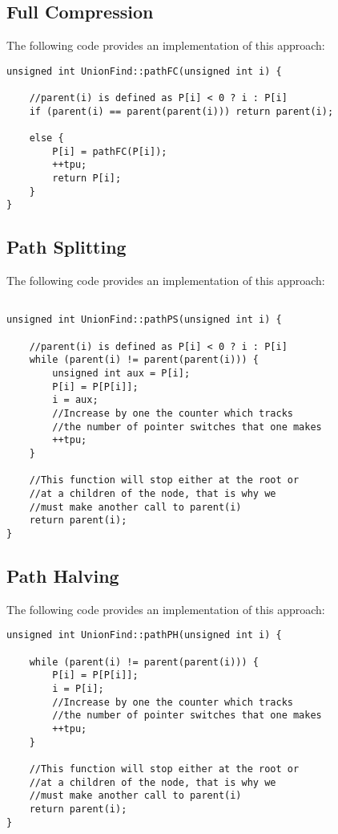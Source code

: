 \subsection{Full Compression}
The following code provides an implementation of this approach:

\begin{verbatim}
unsigned int UnionFind::pathFC(unsigned int i) {

    //parent(i) is defined as P[i] < 0 ? i : P[i]
    if (parent(i) == parent(parent(i))) return parent(i);

    else {
        P[i] = pathFC(P[i]);
        ++tpu;
        return P[i];
    }
}
\end{verbatim}

\subsection{Path Splitting}
The following code provides an implementation of this approach:

\begin{verbatim}

unsigned int UnionFind::pathPS(unsigned int i) {

    //parent(i) is defined as P[i] < 0 ? i : P[i]
    while (parent(i) != parent(parent(i))) {
        unsigned int aux = P[i];
        P[i] = P[P[i]];
        i = aux;
        //Increase by one the counter which tracks 
        //the number of pointer switches that one makes
        ++tpu;
    }

    //This function will stop either at the root or
    //at a children of the node, that is why we 
    //must make another call to parent(i)
    return parent(i);
}
\end{verbatim}


\subsection{Path Halving}
The following code provides an implementation of this approach:

\begin{verbatim}
unsigned int UnionFind::pathPH(unsigned int i) {

    while (parent(i) != parent(parent(i))) {
        P[i] = P[P[i]];
        i = P[i];
        //Increase by one the counter which tracks 
        //the number of pointer switches that one makes
        ++tpu;
    }

    //This function will stop either at the root or
    //at a children of the node, that is why we 
    //must make another call to parent(i)
    return parent(i);
}
\end{verbatim}

